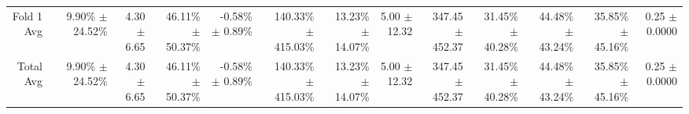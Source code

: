 \begin{table}[H]
{\begin{tabular}{rrrrrrrrrrrrrr}
\midrule
\midrule
Fold 1 Avg &  & \shortstack{9.90\% \\ $\pm$ 24.52\%} & \shortstack{4.30 \\ $\pm$ 6.65} & \shortstack{46.11\% \\ $\pm$ 50.37\%} & \shortstack{-0.58\% \\ $\pm$ 0.89\%} & \shortstack{140.33\% \\ $\pm$ 415.03\%} & \shortstack{13.23\% \\ $\pm$ 14.07\%} & \shortstack{5.00 \\ $\pm$ 12.32} & \shortstack{347.45 \\ $\pm$ 452.37} & \shortstack{31.45\% \\ $\pm$ 40.28\%} & \shortstack{44.48\% \\ $\pm$ 43.24\%} & \shortstack{35.85\% \\ $\pm$ 45.16\%} & \shortstack{0.25 \\ $\pm$ 0.0000} \\
Total Avg &  & \shortstack{9.90\% \\ $\pm$ 24.52\%} & \shortstack{4.30 \\ $\pm$ 6.65} & \shortstack{46.11\% \\ $\pm$ 50.37\%} & \shortstack{-0.58\% \\ $\pm$ 0.89\%} & \shortstack{140.33\% \\ $\pm$ 415.03\%} & \shortstack{13.23\% \\ $\pm$ 14.07\%} & \shortstack{5.00 \\ $\pm$ 12.32} & \shortstack{347.45 \\ $\pm$ 452.37} & \shortstack{31.45\% \\ $\pm$ 40.28\%} & \shortstack{44.48\% \\ $\pm$ 43.24\%} & \shortstack{35.85\% \\ $\pm$ 45.16\%} & \shortstack{0.25 \\ $\pm$ 0.0000} \\
\bottomrule
\end{tabular}}
\end{table}
